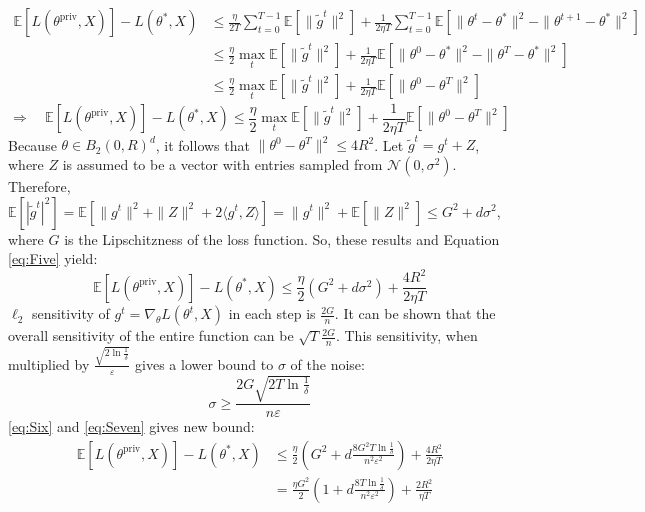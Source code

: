 \documentclass[12pt]{extarticle}
\begin{document}
\begin{align*}
	\mathbb{E}[L(\theta^\text{priv}, X)] -  L(\theta^{*}, X) &\leq \frac{\eta}{2T}\sum_{t=0}^{T-1}\mathbb{E}[\|\tilde{g}^{t}\|^2] + \frac{1}{2\eta T}\sum_{t=0}^{T-1}\mathbb{E} [\|\theta^{t} - \theta^{*}\|^2 - \|\theta^{t+1} - \theta^{*}\|^2]\\
	&\leq \frac{\eta}{2}\max_t \mathbb{E}[\|\tilde{g}^{t}\|^2] + \frac{1}{2\eta T}\mathbb{E} [\|\theta^{0}- \theta^{*}\|^2 - \|\theta^{T}- \theta^{*}\|^2]\\
	&\leq \frac{\eta}{2}\max_t \mathbb{E}[\|\tilde{g}^{t}\|^2] + \frac{1}{2\eta T}\mathbb{E} [\|\theta^{0}-\theta^{T}\|^2]
\end{align*}
\begin{equation}
	\Rightarrow\quad \mathbb{E}[L(\theta^\text{priv}, X)] -  L(\theta^{*}, X) \leq \frac{\eta}{2}\max_t \mathbb{E}[\|\tilde{g}^{t}\|^2] + \frac{1}{2\eta T}\mathbb{E} [\|\theta^{0}-\theta^{T}\|^2]\label{eq:Five}
\end{equation}
Because $\theta \in B_2(0, R)^d$, it follows that $\|\theta^{0}-\theta^{T}\|^2 \le 4R^2$. Let $\tilde{g}^{t} = {g}^{t} + Z$, where $Z$ is assumed to be a vector with entries sampled from $\mathcal{N}(0,\sigma^2)$. Therefore, $\mathbb{E}[|\tilde{g}^{t}|^2] = \mathbb{E}[\|g^{t}\|^2 + \|Z\|^2 + 2\langle g^{t},Z\rangle] = \|g^{t}\|^2 + \mathbb{E}[\|Z\|^2] \le G^2 + d\sigma^2$, where $G$ is the Lipschitzness of the loss function. So, these results and Equation \ref{eq:Five} yield:
\begin{equation}
	\mathbb{E}[L(\theta^\text{priv}, X)] -  L(\theta^{*}, X) \leq \frac{\eta}{2}( G^2 + d\sigma^2) + \frac{4R^2}{2\eta T}\label{eq:Six}
\end{equation}
$\ell_2$ sensitivity of $g^t = \nabla_\theta L(\theta^t, X)$ in each step is $\frac{2G}{n}$. It can be shown that the overall sensitivity of the entire function can be $\sqrt{T}\frac{2G}{n}$. This sensitivity, when multiplied by $\frac{\sqrt{2\ln\frac{1}{\delta}}}{\varepsilon}$ gives a lower bound to $\sigma$ of the noise:
\begin{equation}
\sigma\ge\frac{2G\sqrt{2T\ln\frac{1}{\delta}}}{n\varepsilon} \label{eq:Seven}
\end{equation}
\ref{eq:Six} and \ref{eq:Seven} gives new bound:
\begin{align}
	\mathbb{E}[L(\theta^\text{priv}, X)] -  L(\theta^{*}, X) &\leq \frac{\eta}{2}( G^2 + d\frac{8G^2T\ln\frac{1}{\delta}}{n^2\varepsilon^2}) + \frac{4R^2}{2\eta T}\nonumber \\ &= \frac{\eta G^2}{2}( 1 + d\frac{8T\ln\frac{1}{\delta}}{n^2\varepsilon^2}) + \frac{2R^2}{\eta T}\label{eq:Eight}
\end{align}
\end{document}
